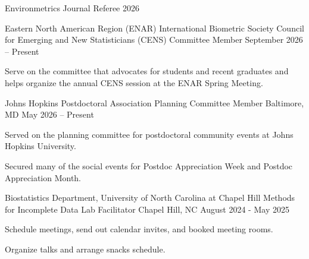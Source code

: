 

\begin{cventries}

  \cventry
    {Environmetrics} %
    {Journal Referee} %
    {} %
    {2026} %
    {}

  \cventry
    {Eastern North American Region (ENAR) International Biometric Society} %
    {Council for Emerging and New Statisticians (CENS) Committee Member} %
    {} %
    {September 2026 -- Present} %
    {
      \begin{cvitems} %
        \item Serve on the committee that advocates for students and recent graduates and helps organize the annual CENS session at the ENAR Spring Meeting.
      \end{cvitems}
    }

  \cventry
    {Johns Hopkins Postdoctoral Association} %
    {Planning Committee Member} %
    {Baltimore, MD} %
    {May 2026 -- Present} %
    {
      \begin{cvitems} %
        \item Served on the planning committee for postdoctoral community events at Johns Hopkins University.
        \item Secured many of the social events for Postdoc Appreciation Week and Postdoc Appreciation Month.
      \end{cvitems}
    }


  \cventry
    {Biostatistics Department, University of North Carolina at Chapel Hill} %
    {Methods for Incomplete Data Lab Facilitator} %
    {Chapel Hill, NC} %
    {August 2024 - May 2025} %
    {
      \begin{cvitems} 
        \item Schedule meetings, send out calendar invites, and booked meeting rooms.
        \item Organize talks and arrange snacks schedule.
      \end{cvitems}
    }


\end{cventries}
